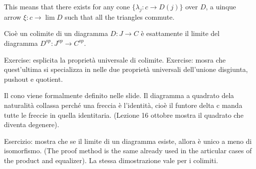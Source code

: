 \documentclass[a4paper]{article}
\begin{document}
\begin{center}
\end{center}
This means that there exists for any cone
\(\{\lambda_j \colon c \to D(j)\}\) over \(D\), a uinque arrow
\(\xi \colon c \to \lim D\) such that all the triangles commute.



Cioè un colimite di un diagramma \(D \colon J \to C\)
è esattamente il limite del diagramma \(D^{op} \colon J^{op} \to C^{op}\).

Exercise: esplicita la proprietà universale di colimite. 
Exercise: mosra che quest'ultima si specializza in nelle due proprietà universali
dell'unione disgiunta, pushout e quotient.

Il cono viene formalmente definito nelle slide.
Il diagramma a quadrato dela naturalità collassa perché una freccia è l'identità,
cioè il funtore delta c manda tutte le freccie in quella identitaria.
(Lezione 16 ottobre mostra il quadrato che diventa degenere).

Esercizio: mostra che se il limite di un diagramma esiste, allora è unico a meno di isomorfismo.
(The proof method is the same already used in the articular cases of the product and equalizer).
La stessa dimostrazione vale per i colimiti.
\end{document}

